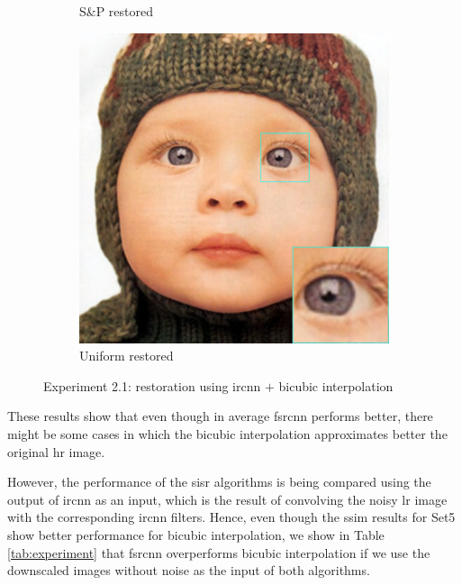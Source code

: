 \begin{figure}
\begin{subfigure}{0.24\textwidth}
		\caption{S\&P restored}
	\end{subfigure}
	\begin{subfigure}{0.24\textwidth}
		\includegraphics[width=\textwidth]{images/exp2.1/uniform.png}
		\caption{Uniform restored}
	\end{subfigure}
	\caption{Experiment 2.1: restoration using \gls{ircnn} $+$ bicubic interpolation}
	\label{fig:exp2.1}
\end{figure}

These results show that even though in average \gls{fsrcnn} performs better, there might be some cases in which the bicubic interpolation approximates better the original \gls{hr} image.

However, the performance of the \gls{sisr} algorithms is being compared using the output of \gls{ircnn} as an input, which is the result of convolving the noisy \gls{lr} image with the corresponding \gls{ircnn} filters. Hence, even though the \gls{ssim} results for Set5 show better performance for bicubic interpolation, we show in Table \ref{tab:experiment} that \gls{fsrcnn} overperforms bicubic interpolation if we use the downscaled images without noise as the input of both algorithms.

